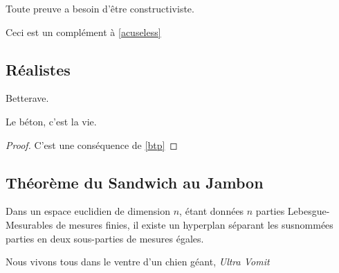 \documentclass{cours}
\begin{document}
\begin{proposition}\label{btp}
    Toute preuve a besoin d'être constructiviste.
\end{proposition}
\begin{remark}
    Ceci est un complément à \ref*{acuseless}
\end{remark}

\subsection{Réalistes}
\begin{proposition}
    Betterave.
\end{proposition}

\begin{proposition}
    Le béton, c'est la vie.
\end{proposition}
\begin{proof}
    C'est une conséquence de \ref{btp}
\end{proof}

\subsection{Théorème du Sandwich au Jambon}
\begin{theorem}
    Dans un espace euclidien de dimension $n$, étant données $n$ parties Lebesgue-Mesurables de mesures finies, il existe un hyperplan séparant les susnommées parties en deux sous-parties de mesures égales. 
\end{theorem}


\begin{thebibliography}{9}
     Nous vivons tous dans le ventre d'un chien géant, \textit{Ultra Vomit}
\end{thebibliography}
\end{document}
